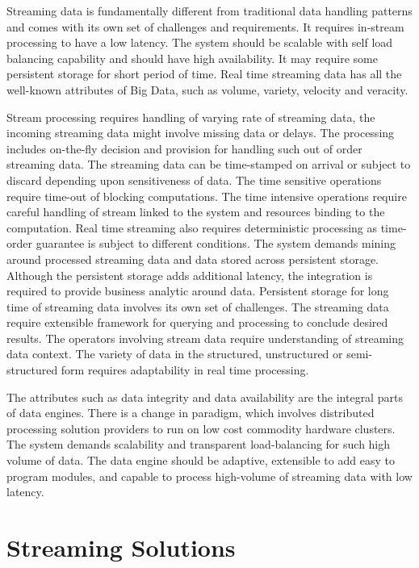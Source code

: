\documentclass{acm_proc_article-sp}
\begin{document}
Streaming data is fundamentally different from traditional data handling patterns and comes with its own set of challenges and requirements.  It requires in-stream processing to have a low latency.  The system should be scalable with self load balancing capability and should have high availability. It may require some persistent storage for short period of time. Real time streaming data has all the well-known attributes of Big Data, such as volume, variety, velocity and veracity.

Stream processing requires handling of varying rate of streaming data, the incoming streaming data might involve missing data or delays. The processing includes on-the-fly decision and provision for handling such out of order streaming data. The streaming data can be time-stamped on arrival or subject to discard depending upon sensitiveness of data. The time sensitive operations require time-out of blocking computations. The time intensive operations require careful handling of stream linked to the system and resources binding to the computation. Real time streaming also requires deterministic processing as time-order guarantee is subject to different conditions. The system demands mining around processed streaming data and data stored across persistent storage. Although the persistent storage adds additional latency, the integration is required to provide business analytic around data. Persistent storage for long time of streaming data involves its own set of challenges. The streaming data require extensible framework for querying and processing to conclude desired results. The operators involving stream data require understanding of streaming data context. The variety of data in the structured, unstructured or semi-structured form requires adaptability in real time processing.  

The attributes such as data integrity and data availability are the integral parts of data engines. There is a change in paradigm, which involves distributed processing solution providers to run on low cost commodity hardware clusters. The system demands scalability and transparent load-balancing for such high volume of data.  The data engine should be adaptive, extensible to add easy to program modules, and capable to process high-volume of streaming data with low latency.
 
\section{Streaming Solutions}
\end{document}
